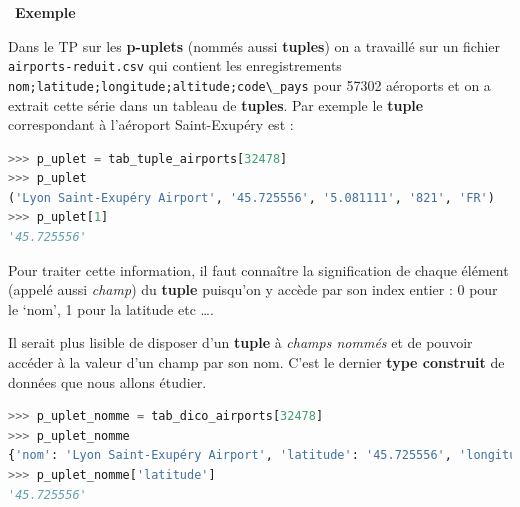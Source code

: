 \documentclass[
  11pt,
]{article}
\newcommand{\passthrough}[1]{#1}
\newcounter{exple}
\newenvironment{exemple}[1]
{\par \medskip   \addtocounter{exple}{1} \noindent  
\begin{bclogo}[arrondi =0.1,   noborder = true, logo=\bclampe, marge=4]{~\textbf{Exemple} \textbf{\theexple} {\itshape #1} }  \par}
{
\end{bclogo}
 \par \bigskip }
\begin{document}
\begin{exemple}{}

Dans le TP sur les \textbf{p-uplets} (nommés aussi \textbf{tuples}) on a
travaillé sur un fichier \passthrough{\lstinline!airports-reduit.csv!}
qui contient les enregistrements
\passthrough{\lstinline!nom;latitude;longitude;altitude;code\_pays!}
pour 57302 aéroports et on a extrait cette série dans un tableau de
\textbf{tuples}. Par exemple le \textbf{tuple} correspondant à
l'aéroport Saint-Exupéry est :

\begin{lstlisting}[language=Python]
>>> p_uplet = tab_tuple_airports[32478]
>>> p_uplet
('Lyon Saint-Exupéry Airport', '45.725556', '5.081111', '821', 'FR')
>>> p_uplet[1]
'45.725556'
\end{lstlisting}

Pour traiter cette information, il faut connaître la signification de
chaque élément (appelé aussi \emph{champ}) du \textbf{tuple} puisqu'on y
accède par son index entier : 0 pour le `nom', 1 pour la latitude etc
\ldots.

Il serait plus lisible de disposer d'un \textbf{tuple} à \emph{champs
nommés} et de pouvoir accéder à la valeur d'un champ par son nom. C'est
le dernier \textbf{type construit} de données que nous allons étudier.

\begin{lstlisting}[language=Python]
>>> p_uplet_nomme = tab_dico_airports[32478]
>>> p_uplet_nomme
{'nom': 'Lyon Saint-Exupéry Airport', 'latitude': '45.725556', 'longitude': '5.081111', 'altitude': '821', 'code_pays': 'FR'}
>>> p_uplet_nomme['latitude']
'45.725556'
\end{lstlisting}

\end{exemple}
\end{document}

